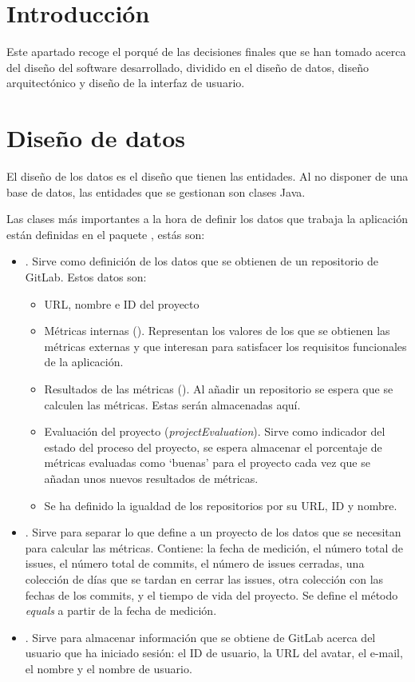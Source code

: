 \label{anex:C}

\section{Introducción}
Este apartado recoge el porqué de las decisiones finales que se han tomado acerca del diseño del software desarrollado, dividido en el diseño de datos, diseño arquitectónico y diseño de la interfaz de usuario.

\section{Diseño de datos}\label{sec:C_2}
El diseño de los datos es el diseño que tienen las entidades. Al no disponer de una base de datos, las entidades que se gestionan son clases Java.

Las clases más importantes a la hora de definir los datos que trabaja la aplicación están definidas en el paquete , estás son:
\begin{itemize}
	\item {}. Sirve como definición de los datos que se obtienen de un repositorio de GitLab. Estos datos son:
	\begin{itemize}
		\item URL, nombre e ID del proyecto
		\item Métricas internas (). Representan los valores de los que se obtienen las métricas externas y que interesan para satisfacer los requisitos funcionales de la aplicación.
		\item Resultados de las métricas (). Al añadir un repositorio se espera que se calculen las métricas. Estas serán almacenadas aquí.
		\item Evaluación del proyecto (\textit{projectEvaluation}). Sirve como indicador del estado del proceso del proyecto, se espera almacenar el porcentaje de métricas evaluadas como `buenas' para el proyecto cada vez que se añadan unos nuevos resultados de métricas.
		\item Se ha definido la igualdad de los repositorios por su URL, ID y nombre.
	\end{itemize}
	\item {}. Sirve para separar lo que define a un proyecto de los datos que se necesitan para calcular las métricas. Contiene: la fecha de medición, el número total de issues, el número total de commits, el número de issues cerradas, una colección de días que se tardan en cerrar las issues, otra colección con las fechas de los commits, y el tiempo de vida del proyecto. Se define el método \textit{equals} a partir de la fecha de medición.
	\item {}. Sirve para almacenar información que se obtiene de GitLab acerca del usuario que ha iniciado sesión: el ID de usuario, la URL del avatar, el e-mail, el nombre y el nombre de usuario.
\end{itemize}

